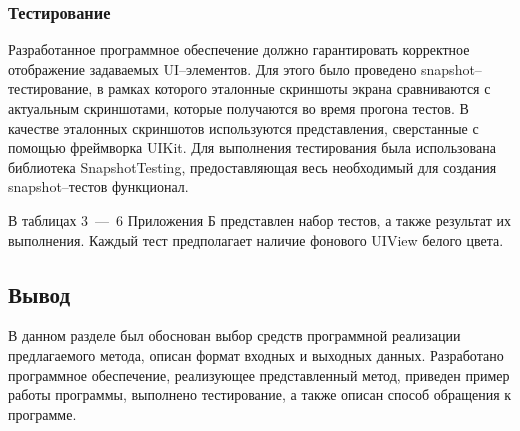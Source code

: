 \subsubsection{Тестирование}
Разработанное программное обеспечение должно гарантировать корректное отображение задаваемых UI--элементов.
Для этого было проведено snapshot--тестирование, в рамках которого эталонные скриншоты экрана сравниваются с актуальным скриншотами, которые получаются во время прогона тестов.
В качестве эталонных скриншотов используются представления, сверстанные с помощью фреймворка UIKit.
Для выполнения тестирования была использована библиотека SnapshotTesting, предоставляющая весь необходимый для создания snapshot--тестов функционал.

В таблицах 3~---~6 Приложения Б представлен набор тестов, а также результат их выполнения.
Каждый тест предполагает наличие фонового UIView белого цвета.

\subsection*{Вывод}

В данном разделе был обоснован выбор средств программной реализации предлагаемого метода, описан формат входных и выходных данных. 
Разработано программное обеспечение, реализующее представленный метод, приведен пример работы программы, выполнено тестирование, а также описан способ обращения к программе.

\pagebreak